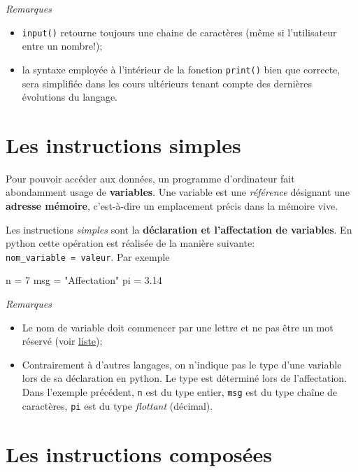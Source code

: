 \documentclass[11pt,french]{article}
\newenvironment{Shaded}{}{}
\newcommand{\DecValTok}[1]{\textcolor[rgb]{0.25,0.63,0.44}{{#1}}}
\newcommand{\FloatTok}[1]{\textcolor[rgb]{0.25,0.63,0.44}{{#1}}}
\newcommand{\StringTok}[1]{\textcolor[rgb]{0.25,0.44,0.63}{{#1}}}
\newcommand{\NormalTok}[1]{{#1}}
\newcommand{\OperatorTok}[1]{\textcolor[rgb]{0.40,0.40,0.40}{{#1}}}
\begin{document}
    \emph{Remarques}
    \begin{itemize}
	\item \texttt{input()} retourne toujours une chaine de caractères (même si
	l'utilisateur entre un nombre!);
	\item  la syntaxe employée à l'intérieur de la fonction \texttt{print()} bien
que correcte, sera simplifiée dans les cours ultérieurs tenant compte
des dernières évolutions du langage.
	\end{itemize}

\hypertarget{les-instructions-simples}{%
\section{Les instructions simples}\label{les-instructions-simples}}

Pour pouvoir accéder aux données, un programme d'ordinateur fait
abondamment usage de \textbf{variables}. Une variable est une
\emph{référence} désignant une \textbf{adresse mémoire}, c'est-à-dire un
emplacement précis dans la mémoire vive.\par
Les instructions \emph{simples} sont la \textbf{déclaration et
l'affectation de variables}. En python cette opération est réalisée de
la manière suivante:
\texttt{nom\_variable\ =\ valeur}. Par exemple
\begin{Shaded}
\begin{Highlighting}[]
\NormalTok{n }\OperatorTok{=} \DecValTok{7}
\NormalTok{msg }\OperatorTok{=} \StringTok{"Affectation"}
\NormalTok{pi }\OperatorTok{=} \FloatTok{3.14}
\end{Highlighting}
\end{Shaded}

\emph{Remarques}
\begin{itemize}
\item Le nom de variable doit commencer par une lettre et ne pas être un mot
réservé (voir
\href{https://docs.python.org/fr/3.7/reference/lexical_analysis.html\#keywords}{liste});
\item Contrairement à d'autres langages, on n'indique pas le type d'une
variable lors de sa déclaration en python. Le type est déterminé lors de
l'affectation. Dans l'exemple précédent, \texttt{n} est du type entier,
\texttt{msg} est du type chaîne de caractères, \texttt{pi} est du type
\emph{flottant} (décimal).
\end{itemize}

    \hypertarget{les-instructions-composuxe9es}{%
\section{Les instructions
composées}\label{les-instructions-composuxe9es}}
\end{document}
